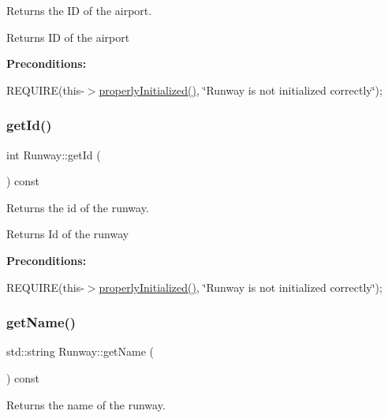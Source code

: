 Returns the ID of the airport. 

\begin{DoxyReturn}{Returns}
ID of the airport
\end{DoxyReturn}
{\bfseries Preconditions\+:}
\begin{DoxyItemize}
\item R\+E\+Q\+U\+I\+RE(this-\/$>$\mbox{\hyperlink{class_runway_a360d98246cabf3aa929765f81a656348}{properly\+Initialized()}}, \char`\"{}\+Runway is not initialized correctly\char`\"{}); 
\end{DoxyItemize}\mbox{\label{class_runway_afd718b92fbf2bdcbdc5c3da48a76c7af}} 
\subsubsection{\texorpdfstring{get\+Id()}{getId()}}
{\footnotesize\ttfamily int Runway\+::get\+Id (\begin{DoxyParamCaption}{ }\end{DoxyParamCaption}) const}



Returns the id of the runway. 

\begin{DoxyReturn}{Returns}
Id of the runway
\end{DoxyReturn}
{\bfseries Preconditions\+:}
\begin{DoxyItemize}
\item R\+E\+Q\+U\+I\+RE(this-\/$>$\mbox{\hyperlink{class_runway_a360d98246cabf3aa929765f81a656348}{properly\+Initialized()}}, \char`\"{}\+Runway is not initialized correctly\char`\"{}); 
\end{DoxyItemize}\mbox{\label{class_runway_a525e4c94639bde05c335492d5229f882}} 
\subsubsection{\texorpdfstring{get\+Name()}{getName()}}
{\footnotesize\ttfamily std\+::string Runway\+::get\+Name (\begin{DoxyParamCaption}{ }\end{DoxyParamCaption}) const}



Returns the name of the runway. 

